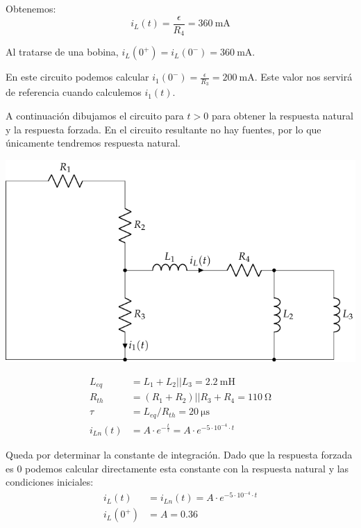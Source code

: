 \vspace{2mm}
Obtenemos:
\begin{equation*}
  i_L(t) = \frac{\epsilon}{R_4} = \SI{360}{\milli\ampere}
\end{equation*}

\vspace{3mm}
Al tratarse de una bobina,
$i_L(0^+) = i_L(0^-) = \SI{360}{\milli\ampere}$.

\vspace{3mm}
En este circuito podemos calcular
$i_1(0^-) = \frac{\epsilon}{R_3} = \SI{200}{\milli\ampere}$. Este
valor nos servirá de referencia cuando calculemos $i_1(t)$.

\vspace{3mm}
A continuación dibujamos el circuito para $t > 0$ para obtener la
respuesta natural y la respuesta forzada. En el circuito resultante no
hay fuentes, por lo que únicamente tendremos respuesta natural.

\begin{center}
  \includegraphics[scale=0.9]{figuras/HKD84_natural}
\end{center}

\vspace{-2mm}
  \begin{align*}
    L_{eq} &= L_1 + L_2||L_3 = \SI{2.2}{\milli\henry}\\
    R_{th} &= (R_1 + R_2) || R_3 + R_4  = \SI{110}{\ohm}\\
    \tau &= L_{eq}/R_{th} = \SI{20}{\micro\second}\\
    i_{Ln}(t) &= A \cdot e^{-\frac{t}{\tau}} = A \cdot e^{-5 \cdot 10^{-4} \cdot t}
  \end{align*}

  Queda por determinar la constante de integración. Dado que la
  respuesta forzada es 0 podemos calcular directamente esta constante
  con la respuesta natural y las condiciones iniciales:
\begin{align*}
  i_L(t) &= i_{Ln}(t) = A \cdot e^{-5 \cdot 10^{-4} \cdot t}\\
  i_L(0^+) &= A = 0.36
\end{align*}


